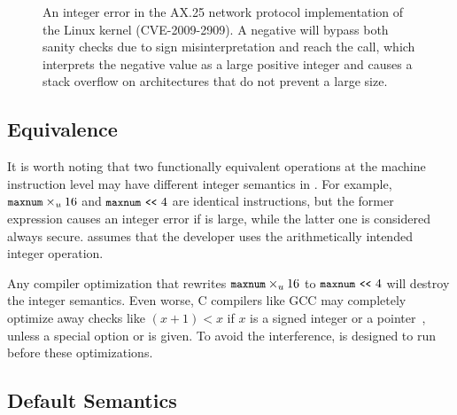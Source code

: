 \begin{figure}
\centering

\vspace{-1em}
\caption{An integer error in the AX.25 network protocol implementation
of the Linux kernel (CVE-2009-2909).  A negative  will
bypass both sanity checks due to sign misinterpretation and reach
the  call, which interprets the negative value
as a large positive integer and causes a stack overflow on architectures
that do not prevent a large  size.}
\label{f:ax25-sign}
\end{figure}

\subsection{Equivalence}
\label{s:sema:eqv}

It is worth noting that two functionally equivalent operations at
the machine instruction level may have different integer semantics
in \sys.
For example, $\cc{maxnum}\times_u 16$ and $\cc{maxnum} \shl 4$ are
identical instructions, but the former expression causes an integer
error if  is large, while the latter one is considered
always secure.  \sys assumes that the developer uses the
arithmetically intended integer operation. 

Any compiler optimization that rewrites
$\cc{maxnum}\times_u 16$ to $\cc{maxnum} \shl 4$ will destroy the
integer semantics.  Even worse, C compilers like GCC may completely
optimize away checks like $(x + 1) < x$ if $x$ is a signed integer
or a pointer~\cite{gcc:signed-overflow,us-cert:gcc}, unless a special
option  or  is
given.  To avoid the interference, \sys is designed to run before
these optimizations.

\subsection{Default Semantics}
\label{s:sema:def}

